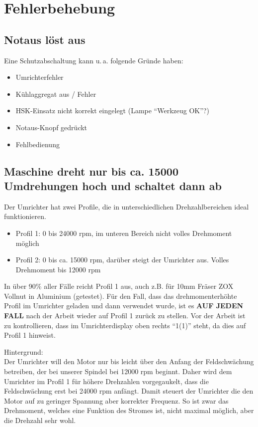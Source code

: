 \documentclass{\basedir/fablab-document}
\begin{document}
\section{Fehlerbehebung}

\subsection{Notaus löst aus}
Eine Schutzabschaltung kann u.\,a. folgende Gründe haben:
\begin{itemize}
	\item Umrichterfehler
	\item Kühlaggregat aus / Fehler
	\item HSK-Einsatz nicht korrekt eingelegt (Lampe \enquote{Werkzeug OK}?)
	\item Notaus-Knopf gedrückt
	\item Fehlbedienung
\end{itemize}

\subsection{Maschine dreht nur bis ca. 15000 Umdrehungen hoch und schaltet dann ab}
Der Umrichter hat zwei Profile, die in unterschiedlichen Drehzahlbereichen ideal funktionieren.
\begin{itemize}
	\item Profil 1: 0 bis 24000 rpm, im unteren Bereich nicht volles Drehmoment möglich
	\item Profil 2: 0 bis ca. 15000 rpm, darüber steigt der Umrichter aus. Volles Drehmoment bis 12000 rpm
\end{itemize}
In über 90\% aller Fälle reicht Profil 1 aus, auch z.B. für 10mm Fräser ZOX Vollnut in Aluminium (getestet). Für den Fall, dass das drehmomenterhöhte Profil im Umrichter geladen und dann verwendet wurde, ist es \textbf{AUF JEDEN FALL} nach der Arbeit wieder auf Profil 1 zurück zu stellen. Vor der Arbeit ist zu kontrollieren, dass im Umrichterdisplay oben rechts \enquote{1(1)} steht, da dies auf Profil 1 hinweist.

Hintergrund:\\
Der Umrichter will den Motor nur bis leicht über den Anfang der Feldschwächung betreiben, der bei unserer Spindel bei 12000 rpm beginnt. Daher wird dem Umrichter im Profil 1 für höhere Drehzahlen vorgegaukelt, dass die Feldschwächung erst bei 24000 rpm anfängt. Damit steuert der Umrichter die den Motor auf zu geringer Spannung aber korrekter Frequenz. So ist zwar das Drehmoment, welches eine Funktion des Stromes ist, nicht maximal möglich, aber die Drehzahl sehr wohl. 
\end{document}
